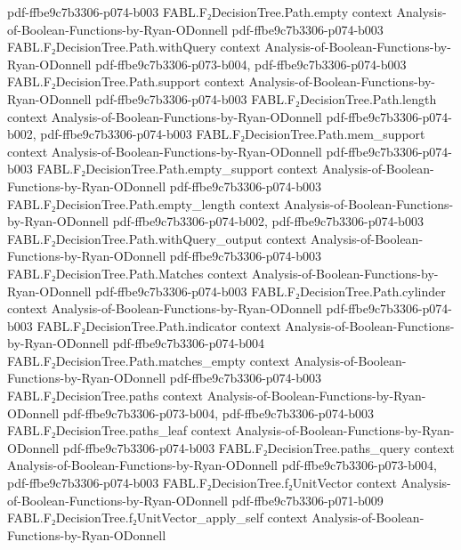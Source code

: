 \begin{theorem}
  {pdf-ffbe9c7b3306-p074-b003}
\proofstep
  {FABL.F₂DecisionTree.Path.empty}
  {context}
  {Analysis-of-Boolean-Functions-by-Ryan-ODonnell}
  {pdf-ffbe9c7b3306-p074-b003}
\proofstep
  {FABL.F₂DecisionTree.Path.withQuery}
  {context}
  {Analysis-of-Boolean-Functions-by-Ryan-ODonnell}
  {pdf-ffbe9c7b3306-p073-b004,
    pdf-ffbe9c7b3306-p074-b003}
\proofstep
  {FABL.F₂DecisionTree.Path.support}
  {context}
  {Analysis-of-Boolean-Functions-by-Ryan-ODonnell}
  {pdf-ffbe9c7b3306-p074-b003}
\proofstep
  {FABL.F₂DecisionTree.Path.length}
  {context}
  {Analysis-of-Boolean-Functions-by-Ryan-ODonnell}
  {pdf-ffbe9c7b3306-p074-b002,
    pdf-ffbe9c7b3306-p074-b003}
\proofstep
  {FABL.F₂DecisionTree.Path.mem_support}
  {context}
  {Analysis-of-Boolean-Functions-by-Ryan-ODonnell}
  {pdf-ffbe9c7b3306-p074-b003}
\proofstep
  {FABL.F₂DecisionTree.Path.empty_support}
  {context}
  {Analysis-of-Boolean-Functions-by-Ryan-ODonnell}
  {pdf-ffbe9c7b3306-p074-b003}
\proofstep
  {FABL.F₂DecisionTree.Path.empty_length}
  {context}
  {Analysis-of-Boolean-Functions-by-Ryan-ODonnell}
  {pdf-ffbe9c7b3306-p074-b002,
    pdf-ffbe9c7b3306-p074-b003}
\proofstep
  {FABL.F₂DecisionTree.Path.withQuery_output}
  {context}
  {Analysis-of-Boolean-Functions-by-Ryan-ODonnell}
  {pdf-ffbe9c7b3306-p074-b003}
\proofstep
  {FABL.F₂DecisionTree.Path.Matches}
  {context}
  {Analysis-of-Boolean-Functions-by-Ryan-ODonnell}
  {pdf-ffbe9c7b3306-p074-b003}
\proofstep
  {FABL.F₂DecisionTree.Path.cylinder}
  {context}
  {Analysis-of-Boolean-Functions-by-Ryan-ODonnell}
  {pdf-ffbe9c7b3306-p074-b003}
\proofstep
  {FABL.F₂DecisionTree.Path.indicator}
  {context}
  {Analysis-of-Boolean-Functions-by-Ryan-ODonnell}
  {pdf-ffbe9c7b3306-p074-b004}
\proofstep
  {FABL.F₂DecisionTree.Path.matches_empty}
  {context}
  {Analysis-of-Boolean-Functions-by-Ryan-ODonnell}
  {pdf-ffbe9c7b3306-p074-b003}
\proofstep
  {FABL.F₂DecisionTree.paths}
  {context}
  {Analysis-of-Boolean-Functions-by-Ryan-ODonnell}
  {pdf-ffbe9c7b3306-p073-b004,
    pdf-ffbe9c7b3306-p074-b003}
\proofstep
  {FABL.F₂DecisionTree.paths_leaf}
  {context}
  {Analysis-of-Boolean-Functions-by-Ryan-ODonnell}
  {pdf-ffbe9c7b3306-p074-b003}
\proofstep
  {FABL.F₂DecisionTree.paths_query}
  {context}
  {Analysis-of-Boolean-Functions-by-Ryan-ODonnell}
  {pdf-ffbe9c7b3306-p073-b004,
    pdf-ffbe9c7b3306-p074-b003}
\proofstep
  {FABL.F₂DecisionTree.f₂UnitVector}
  {context}
  {Analysis-of-Boolean-Functions-by-Ryan-ODonnell}
  {pdf-ffbe9c7b3306-p071-b009}
\proofstep
  {FABL.F₂DecisionTree.f₂UnitVector_apply_self}
  {context}
  {Analysis-of-Boolean-Functions-by-Ryan-ODonnell}

\end{theorem}
